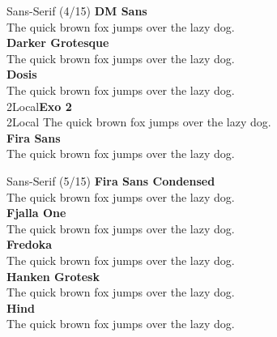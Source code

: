 \documentclass[10pt]{beamer}
\begin{document}
\begin{frame}{Sans-Serif (4/15)}
\vspace{-0.2cm}
  {\DMSansLocal\Large\bfseries DM Sans\\}
  {\DMSansLocal The quick brown fox jumps over the lazy dog.\\[0.3cm]}
  {\DarkerGrotesqueLocal\Large\bfseries Darker Grotesque\\}
  {\DarkerGrotesqueLocal The quick brown fox jumps over the lazy dog.\\[0.3cm]}
  {\DosisLocal\Large\bfseries Dosis\\}
  {\DosisLocal The quick brown fox jumps over the lazy dog.\\[0.3cm]}
  {\Exo2Local\Large\bfseries Exo 2\\}
  {\Exo2Local The quick brown fox jumps over the lazy dog.\\[0.3cm]}
  {\FiraSansLocal\Large\bfseries Fira Sans\\}
  {\FiraSansLocal The quick brown fox jumps over the lazy dog.\\[0.3cm]}
\end{frame}

\begin{frame}{Sans-Serif (5/15)}
\vspace{-0.2cm}
  {\FiraSansCondensedLocal\Large\bfseries Fira Sans Condensed\\}
  {\FiraSansCondensedLocal The quick brown fox jumps over the lazy dog.\\[0.3cm]}
  {\FjallaOneLocal\Large\bfseries Fjalla One\\}
  {\FjallaOneLocal The quick brown fox jumps over the lazy dog.\\[0.3cm]}
  {\FredokaLocal\Large\bfseries Fredoka\\}
  {\FredokaLocal The quick brown fox jumps over the lazy dog.\\[0.3cm]}
  {\HankenGroteskLocal\Large\bfseries Hanken Grotesk\\}
  {\HankenGroteskLocal The quick brown fox jumps over the lazy dog.\\[0.3cm]}
  {\HindLocal\Large\bfseries Hind\\}
  {\HindLocal The quick brown fox jumps over the lazy dog.\\[0.3cm]}
\end{frame}
\end{document}

